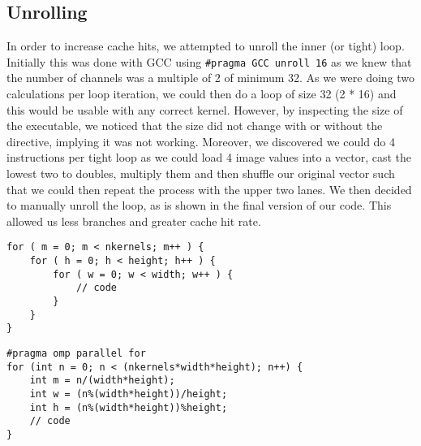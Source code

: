 \documentclass[12pt,fleqn,leqno,letterpaper]{article}
\begin{document}
\subsection{Unrolling}
In order to increase cache hits, we attempted to unroll the inner (or tight) loop. Initially this was done 
with GCC using \lstinline{#pragma GCC unroll 16} as we knew that the number of channels was a multiple of 2 of minimum 32.
As we were doing two calculations per loop iteration, we could then do a loop of size 32 (2 * 16) and this would
be usable with any correct kernel. However, by inspecting the size of the executable, we noticed that the size did not change
with or without the directive, implying it was not working. Moreover, we discovered we could do 4 instructions per tight loop
as we could load 4 image values into a vector, cast the lowest two to doubles, multiply them and then shuffle our original vector
such that we could then repeat the process with the upper two lanes. We then decided to manually unroll the loop, as is shown in 
the final version of our code. This allowed us less branches and greater cache hit rate.

\newpage
\begin{verbatim}
for ( m = 0; m < nkernels; m++ ) {
    for ( h = 0; h < height; h++ ) {
        for ( w = 0; w < width; w++ ) {
            // code
        }
    }
}
\end{verbatim}

\begin{verbatim}
#pragma omp parallel for
for (int n = 0; n < (nkernels*width*height); n++) {
    int m = n/(width*height);
    int w = (n%(width*height))/height;
    int h = (n%(width*height))%height;
    // code
}
\end{verbatim}
\end{document}
